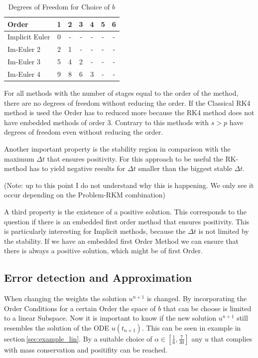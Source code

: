 \documentclass[a4paper]{scrartcl}
\numberwithin{equation}{section}
\theoremstyle{plain}
\theoremstyle{definition}
\numberwithin{theorem}{section}
\newcommand{\dt}{{\Delta t}}
\newcommand{\1}{\mathbbm{1}}
\begin{document}
 \begin{table}[h!]
\centering   %
 \begin{tabular}{|l |c c c c c c |} 
 \hline 
Order &1&2&3&4&5&6 \\ 
 \hline Implicit Euler&0& - & - & - & - & -  \\ 
 Im-Euler 2&2&1& - & - & - & -  \\ 
 Im-Euler 3&5&4&2& - & - & -  \\ 
 Im-Euler 4&9&8&6&3& - & -  \\ 
 \hline 
 \end{tabular}
 \caption{Degrees of Freedom for Choice of $b$} %
 \label{table:DOF_imp}
 \end{table}


For all methods with the number of stages equal to the order of the method, there are no degrees of freedom without reducing the order. 
If the Classical RK4 method is used the Order has to reduced more because the RK4 method does not have embedded methods of order 3.
Contrary to this methods with $s > p$ have degrees of freedom even without reducing the order. 

Another important property is the stability region in comparison with the maximum $\dt$ that ensures positivity. For this approach to be useful the RK-method has to yield negative results for $\dt$ smaller than the biggest stable $\dt$.

(Note: up to this point I do not understand why this is happening. We only see it occur depending on the Problem-RKM combination)

A third property is the existence of a positive solution. This corresponds to the question if there is an embedded first order method that ensures positivity. This is particularly interesting for Implicit methods, because the $\dt$ is not limited by the stability. 
If we have an embedded first Order Method we can ensure that there is always a positive solution, which might be of first Order. 

\subsection{Error detection and Approximation}
When changing the weights the solution $u^{n+1}$ is changed. 
By incorporating the Order Conditions for a certain Order the space of $b$ that can be choose is limited to a linear Subspace. 
Now it is important to know if the new solution $u^{n+1}$ still resembles the solution of the ODE $u(t_{n+1})$. 
This can be seen in example in section\,\ref{sec:example_lin}.
By a suitable choice of $\alpha \in [\frac{1}{6},\frac{7}{30}]$ any $u$ that complies with mass conservation and positifity can be reached. 
\end{document}
